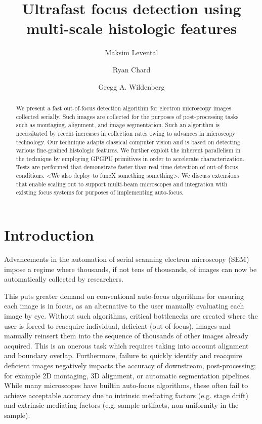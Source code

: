 \documentclass[sigconf,nonacm]{acmart}
\newcommand{\todo}[1]{}
\newcommand{\todo}[1]{{\textcolor{blue}{ TODO: #1 }}}
\begin{document}
\title{Ultrafast focus detection using multi-scale histologic features}


\author{Maksim Levental}
\author{Ryan Chard}
\author{Gregg A. Wildenberg}

\begin{abstract}
    We present a fast out-of-focus detection algorithm for electron microscopy images collected serially.
    Such images are collected for the purposes of post-processing tasks such as montaging, alignment, and image segmentation.
    Such an algorithm is necessitated by recent increases in collection rates owing to advances in microscopy technology.
    Our technique adapts classical computer vision and is based on detecting various fine-grained histologic features.
    We further exploit the inherent parallelism in the technique by employing GPGPU primitives in order to accelerate characterization.
    Tests are performed that demonstrate faster than real time detection of out-of-focus conditions.
    <We also deploy to funcX something something>.
    We discuss extensions that enable scaling out to support multi-beam microscopes and integration with existing focus systems for purposes of implementing auto-focus.

\end{abstract}

\maketitle

\section{Introduction}\label{sec:intro}

Advancements in the automation of serial scanning electron microscopy (SEM)  impose a regime where thousands, if not tens of thousands, of images can now be automatically collected by researchers.
\todo{<bio use cases>}
This puts greater demand on conventional auto-focus algorithms for ensuring each image is in focus, as an alternative to the user manually evaluating each image by eye.
Without such algorithms, critical bottlenecks are created where the user is forced to reacquire individual, deficient (out-of-focus), images and manually reinsert them into the sequence of thousands of other images already acquired.
This is an onerous task which requires taking into account alignment and boundary overlap.
Furthermore, failure to quickly identify and reacquire deficient images negatively impacts the accuracy of downstream, post-processing; for example 2D montaging, 3D alignment, or automatic segmentation pipelines.
While many microscopes have builtin auto-focus algorithms, these often fail to achieve acceptable accuracy due to intrinsic mediating factors (e.g. stage drift) and extrinsic mediating factors (e.g. sample artifacts, non-uniformity in the sample).
\end{document}

